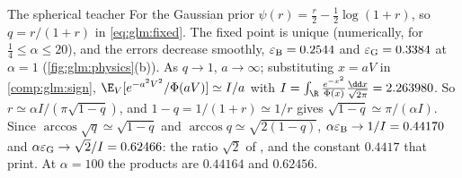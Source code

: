 \begin{refsection}
\begin{computation}{The spherical teacher}\label{comp:glm:largealpha}
\step For the Gaussian prior $\psi(r)=\frac r2-\frac12\log(1+r)$, so $q=r/(1+r)$ in \eqref{eq:glm:fixed}. The fixed point is unique (numerically, for $\frac14\le\alpha\le20$), and the errors decrease smoothly, $\varepsilon_{\mathrm{B}}=0.2544$ and $\varepsilon_{\mathrm{G}}=0.3384$ at $\alpha=1$ (\cref{fig:glm:physics}(b)).
\step As $q\to1$, $a\to\infty$; substituting $x=aV$ in \cref{comp:glm:sign}, $\E_V[e^{-a^2V^2}/\Phi(aV)]\simeq I/a$ with $I=\int_\R\frac{e^{-x^2}}{\Phi(x)}\frac{\dd x}{\sqrt{2\pi}}=2.263980$.
\step So $r\simeq\alpha I/(\pi\sqrt{1-q})$, and $1-q=1/(1+r)\simeq1/r$ gives $\sqrt{1-q}\simeq\pi/(\alpha I)$.
\step Since $\arccos\sqrt q\simeq\sqrt{1-q}$ and $\arccos q\simeq\sqrt{2(1-q)}$, $\alpha\varepsilon_{\mathrm{B}}\to1/I=0.44170$ and $\alpha\varepsilon_{\mathrm{G}}\to\sqrt2/I=0.62466$: the ratio $\sqrt2$ of \textcite{OpperHaussler1991}, and the constant $0.4417$ that \textcite{AubinEtAl2020} print. At $\alpha=100$ the products are $0.44164$ and $0.62456$.
\end{computation}


\end{refsection}
